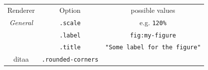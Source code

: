 \documentclass[]{article}
\begin{document}
\begin{longtable}[c]{@{}ccc@{}}
\toprule\addlinespace
\begin{minipage}[b]{0.28\columnwidth}\centering
Renderer
\end{minipage} & \begin{minipage}[b]{0.33\columnwidth}\centering
Option
\end{minipage} & \begin{minipage}[b]{0.25\columnwidth}\centering
possible values
\end{minipage}
\\\addlinespace
\midrule\endhead
\begin{minipage}[t]{0.28\columnwidth}\centering
\emph{General}
\end{minipage} & \begin{minipage}[t]{0.33\columnwidth}\centering
\texttt{.scale}
\end{minipage} & \begin{minipage}[t]{0.25\columnwidth}\centering
e.g. \texttt{120\%}
\end{minipage}
\\\addlinespace
\begin{minipage}[t]{0.28\columnwidth}\centering
\end{minipage} & \begin{minipage}[t]{0.33\columnwidth}\centering
\texttt{.label}
\end{minipage} & \begin{minipage}[t]{0.25\columnwidth}\centering
\texttt{fig:my-figure}
\end{minipage}
\\\addlinespace
\begin{minipage}[t]{0.28\columnwidth}\centering
\end{minipage} & \begin{minipage}[t]{0.33\columnwidth}\centering
\texttt{.title}
\end{minipage} & \begin{minipage}[t]{0.25\columnwidth}\centering
\texttt{"Some label for the figure"}
\end{minipage}
\\\addlinespace
\begin{minipage}[t]{0.28\columnwidth}\centering
ditaa
\end{minipage} & \begin{minipage}[t]{0.33\columnwidth}\centering
\texttt{.rounded-corners}
\end{minipage} & \begin{minipage}[t]{0.25\columnwidth}\centering

\end{minipage}
\end{longtable}
\end{document}
